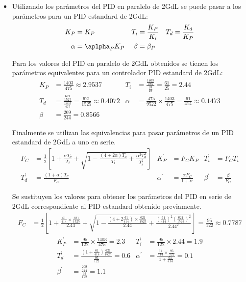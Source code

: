 \begin{ejercicio}
\begin{itemize}
  \item
  Utilizando los parámetros del PID en paralelo de 2GdL se puede pasar a los parámetros para un PID estandard de 2GdL:
  \begin{align*}
    K_P &= K_P
    &
    T_i &= \frac{K_P}{K_i}
    &
    T_d &= \frac{K_d}{K_P}
    \\
    \alpha &= \aplpha_P K_P
    &
    \beta &= \beta_P
  \end{align*}

  Para los valores del PID en paralelo de 2GdL obtenidos se tienen los parámetros equivalentes para un controlador PID estandard de 2GdL:
  \begin{align*}
    K_P &= \frac{1403}{475} \approx 2.9537
    &
    T_i &= \frac{\frac{1403}{475}}{\frac{23}{19}} = \frac{61}{25} = 2.44
    \\
    T_d &= \frac{\frac{621}{1525}}{\frac{1403}{475}} = \frac{621}{1525} \approx 0.4072
    &
    \alpha &= \frac{475}{9522} \times \frac{1403}{475} = \frac{61}{414} \approx 0.1473
    \\
    \beta &= \frac{209}{244} = 0.8566
  \end{align*}

  Finalmente se utilizan las equivalencias para pasar parámetros de un PID estandard de 2GdL a uno en serie.
  \begin{align*}
    F_C &= \frac{1}{2}\left[ 1+ \frac{\alpha T_d}{T_i} + \sqrt{1-\frac{(4+2\alpha)T_d}{T_i} + \frac{\alpha^2T_d^2}{T_i^2}} \right]
    &
    K_P^{'} &= F_C K_P
    &
    T_i^{'} &= F_C T_i
    \\
    T_d^{'} &= \frac{(1+\alpha)T_d}{F_C}
    &
    \alpha^{'} &= \frac{\alpha F_C}{1+\alpha}
    &
    \beta^{'} &= \frac{\beta}{F_C}
  \end{align*}

  Se sustituyen los valores para obtener los parámetros del PID en serie de 2GdL correspondiente al PID estandard obtenido previamente.
  \begin{align*}
    F_C &= \frac{1}{2}\left[ 1+ \frac{\frac{61}{414}\times \frac{621}{1525}}{2.44} + \sqrt{1-\frac{(4+2\frac{61}{414})\times \frac{621}{1525}}{2.44} + \frac{\left(\frac{61}{414}\right)^2\left(\frac{621}{1525}\right)^2}{2.44^2}} \right] = \frac{95}{122} \approx 0.7787
  \end{align*}
  \begin{align*}
    K_P^{'} &= \frac{95}{122} \times \frac{1403}{475} = 2.3
    &
    T_i^{'} &= \frac{95}{122} \times 2.44 = 1.9
    \\
    T_d^{'} &= \frac{(1+\frac{61}{414})\frac{621}{1525}}{\frac{95}{122}} = 0.6
    &
    \alpha^{'} &= \frac{\frac{61}{414} \times \frac{95}{122}}{1+\frac{61}{414}} = 0.1
    \\
    \beta^{'} &= \frac{\frac{209}{244}}{\frac{95}{122}} = 1.1
  \end{align*}
\end{itemize}

\end{ejercicio}